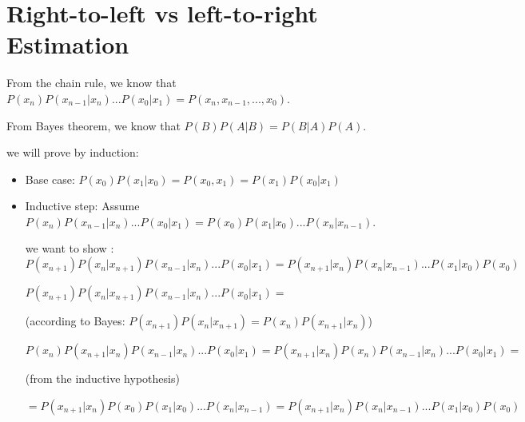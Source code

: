 \documentclass{article}
\begin{document}
\section{Right-to-left vs left-to-right Estimation}

From the chain rule, we know that $P(x_{n})P(x_{n-1}|x_{n})...P(x_{0}|x_{1}) = P(x_{n}, x_{n-1}, ..., x_{0})$.

From Bayes theorem, we know that $P(B)P(A|B)=P(B|A)P(A)$.

we will prove by induction:

\begin{itemize}
    \item Base case: $P(x_{0})P(x_{1}|x_{0}) = P(x_{0}, x_{1}) = P(x_{1})P(x_{0}|x_{1})$
    \item Inductive step: Assume $P(x_{n})P(x_{n-1}|x_{n})...P(x_{0}|x_{1}) =  P(x_{0})P(x_{1}|x_{0})...P(x_{n}|x_{n-1})$.

    we want to show :
    \begin{equation*}
    P(x_{n+1})P(x_{n}|x_{n+1})P(x_{n-1}|x_{n})...P(x_{0}|x_{1}) =P(x_{n+1}|x_{n})P(x_{n}|x_{n-1})...P(x_{1}|x_{0})P(x_{0})
    \end{equation*}

    $P(x_{n+1})P(x_{n}|x_{n+1})P(x_{n-1}|x_{n})...P(x_{0}|x_{1}) = $

    (according to Bayes: $P(x_{n+1})P(x_{n}|x_{n+1}) = P(x_{n})P(x_{n+1}|x_{n})$)

    $P(x_{n})P(x_{n+1}|x_{n})P(x_{n-1}|x_{n})...P(x_{0}|x_{1}) = P(x_{n+1}|x_{n})P(x_{n})P(x_{n-1}|x_{n})...P(x_{0}|x_{1}) =  $

    (from the inductive hypothesis)

    $ = P(x_{n+1}|x_{n})P(x_{0})P(x_{1}|x_{0})...P(x_{n}|x_{n-1}) = P(x_{n+1}|x_{n})P(x_{n}|x_{n-1})...P(x_{1}|x_{0})P(x_{0})$

\end{itemize}



\end{document}
